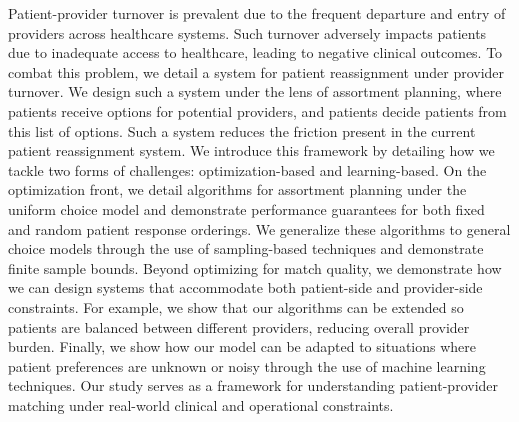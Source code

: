 Patient-provider turnover is prevalent due to the frequent departure and entry of providers across healthcare systems. 
Such turnover adversely impacts patients due to inadequate access to healthcare, leading to negative clinical outcomes. 
To combat this problem, we detail a system for patient reassignment under provider turnover. 
We design such a system under the lens of assortment planning, where patients receive options for potential providers, and patients decide patients from this list of options. 
Such a system reduces the friction present in the current patient reassignment system. 
We introduce this framework by detailing how we tackle two forms of challenges: optimization-based and learning-based. 
On the optimization front, we detail algorithms for assortment planning under the uniform choice model and demonstrate performance guarantees for both fixed and random patient response orderings. 
We generalize these algorithms to general choice models through the use of sampling-based techniques and demonstrate finite sample bounds. 
Beyond optimizing for match quality, we demonstrate how we can design systems that accommodate both patient-side and provider-side constraints. 
For example, we show that our algorithms can be extended so patients are balanced between different providers, reducing overall provider burden. 
Finally, we show how our model can be adapted to situations where patient preferences are unknown or noisy through the use of machine learning techniques. 
Our study serves as a framework for understanding patient-provider matching under real-world clinical and operational constraints. 